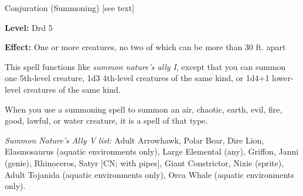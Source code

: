
Conjuration (Summoning) [see text]

\textbf{Level:} Drd 5

\textbf{Effect:} One or more creatures, no two of which can be more than 30 ft. 
apart

This spell functions like \textit{summon nature's ally I}, except that you can 
summon one 5th-level creature, 1d3 4th-level creatures of the same kind, or 1d4+1 
lower-level creatures of the same kind.

When you use a summoning spell to summon an air, chaotic, earth, evil, fire, good, 
lawful, or water creature, it is a spell of that type.

\textit{Summon Nature's Ally V list:} Adult Arrowhawk, Polar Bear, Dire Lion, Elasmosaurus (aquatic environments only), Large Elemental (any), Griffon, Janni (genie), Rhinoceros, Satyr [CN; with pipes], Giant Constrictor, Nixie (sprite), Adult Tojanida (aquatic environments only), Orca Whale (aquatic environments only).
